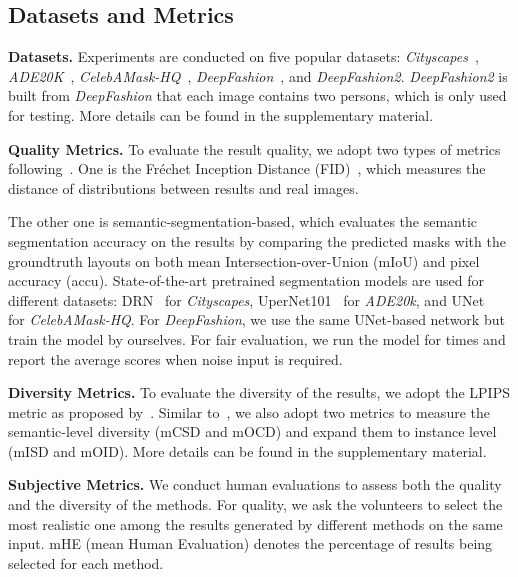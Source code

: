 \documentclass[final]{cvpr}
\begin{document}
\subsection{Datasets and Metrics}
\noindent\textbf{Datasets.} Experiments are conducted on five popular datasets:  \textit{Cityscapes}~\cite{cordts2016cityscapes}, \textit{ADE20K}~\cite{zhou2017scene}, \textit{CelebAMask-HQ}~\cite{lee2020maskgan,karras2017progressive,liu2015deep}, \textit{DeepFashion}~\cite{liu2016deepfashion}, and \textit{DeepFashion2}. 
\textit{DeepFashion2} is built from \textit{DeepFashion} that each image contains two persons, which is only used for testing. More details can be found in the supplementary material.

\noindent\textbf{Quality Metrics.} To evaluate the result quality, we adopt two types of metrics following~\cite{chen2017photographic,wang2018high,park2019semantic,tan2020semantic}. One is the Fr\'echet Inception Distance (FID)~\cite{heusel2017gans}, which measures the distance of distributions between results and real images.

The other one is semantic-segmentation-based, which evaluates the semantic segmentation accuracy on the results by comparing the predicted masks with the groundtruth layouts on both mean Intersection-over-Union (mIoU) and pixel accuracy (accu). State-of-the-art pretrained segmentation models are used for different datasets: DRN~\cite{yu2017dilated,github-drn} for \textit{Cityscapes}, UperNet101~\cite{xiao2018unified,github-upernet} for \textit{ADE20k}, and UNet~\cite{ronneberger2015u,github-celebamask} for \textit{CelebAMask-HQ}. For \textit{DeepFashion}, we use the same UNet-based network but train the model by ourselves. For fair evaluation, we run the model for  times and report the average scores when noise input is required.

\noindent\textbf{Diversity Metrics.} To evaluate the diversity of the results, we adopt the LPIPS metric as proposed by~\cite{zhang2018unreasonable,github-lpips}. Similar to~\cite{zhu2020semantically}, we also adopt two metrics to measure the semantic-level diversity (mCSD and mOCD) and expand them to instance level (mISD and mOID). More details can be found in the supplementary material.

\noindent\textbf{Subjective Metrics.} We conduct human evaluations to assess both the quality and the diversity of the methods. For quality, we ask the volunteers to select the most realistic one among the results generated by different methods on the same input. mHE (mean Human Evaluation) denotes the percentage of results being selected for each method.
\end{document}
